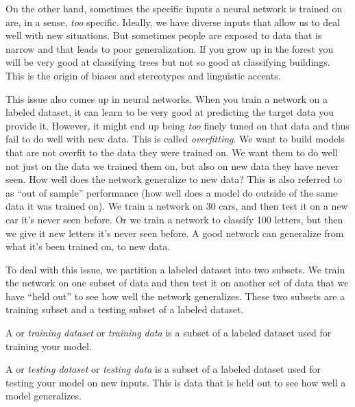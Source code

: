On the other hand, sometimes the specific inputs a neural network is trained on are, in a sense, \emph{too} specific. Ideally, we have diverse inputs that allow us to deal well with new situations. But sometimes people are exposed to  data that is narrow and that leads to poor generalization. If you grow up in the forest you will be very good at classifying trees but not so good at classifying buildings. This is the origin of biases and stereotypes and linguistic accents. 

This issue also comes up in neural networks. When you train a network on a labeled dataset, it can learn to be very good at predicting the target data you provide it. However, it might end up being \emph{too} finely tuned on that data and thus fail to do well with new data. This is called \emph{overfitting}. We want to build models that are not overfit to the data they were trained on. We want them to do well not just on the data we trained them on, but also on new data they have never seen. How well does the network generalize to new data?  This is also referred to as ``out of sample'' performance (how well does a model do outside of the same data it was trained on). We train a network on 30 cars, and then test it on a new car it's never seen before. Or we train a network to classify 100 letters, but then we give it new letters it's never seen before. A good network can generalize from what it's been trained on, to new data.

To deal with this issue, we partition a labeled dataset into two subsets. We train the network on one subset of data and then test it on another set of data that we have ``held out'' to see how well the network generalizes. These two subsets are a training subset and a testing subset of a labeled dataset.

A  or \emph{training dataset} or \emph{training data} is a subset of a labeled dataset used for training your model.

A   or \emph{testing dataset} or \emph{testing data} is a subset of a labeled dataset used for testing your model on new inputs. This is data that is held out to see how well a model generalizes. 

